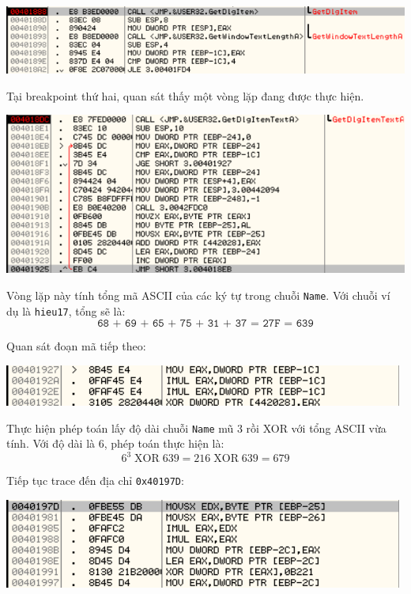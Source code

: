 \begin{center}
    \includegraphics[width=\textwidth]{img/file-3/3.png}
\end{center}

Tại breakpoint thứ hai, quan sát thấy một vòng lặp đang được thực hiện.

\begin{center}
    \includegraphics[width=\textwidth]{img/file-3/4.png}
\end{center}

Vòng lặp này tính tổng mã ASCII của các ký tự trong chuỗi \texttt{Name}. Với chuỗi ví dụ là \texttt{hieu17}, tổng sẽ là:
\[
\texttt{68 + 69 + 65 + 75 + 31 + 37 = 27F = 639}
\]

Quan sát đoạn mã tiếp theo:

\begin{center}
    \includegraphics[width=\textwidth]{img/file-3/5.png}
\end{center}

Thực hiện phép toán lấy độ dài chuỗi \texttt{Name} mũ 3 rồi XOR với tổng ASCII vừa tính. Với độ dài là 6, phép toán thực hiện là:
\[
6^3 \;\mathrm{XOR}\; 639 = 216 \;\mathrm{XOR}\; 639 = 679
\]

Tiếp tục trace đến địa chỉ \texttt{0x40197D}:

\begin{center}
    \includegraphics[width=\textwidth]{img/file-3/6.png}
\end{center}

